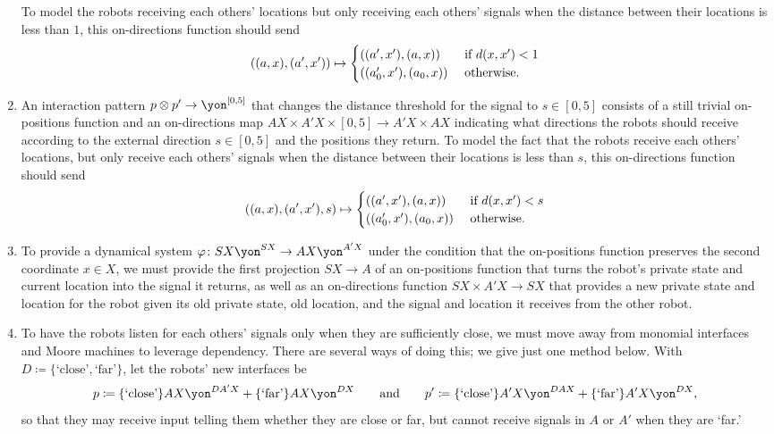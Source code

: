 \documentclass[Book-Poly]{subfiles}
\begin{document}
\begin{exercise}
\begin{solution}
\begin{enumerate}
    To model the robots receiving each others' locations but only receiving each others' signals when the distance between their locations is less than $1$, this on-directions function should send
    \[
        ((a,x),(a',x'))\mapsto
          \begin{cases}
          	((a',x'),(a,x))&\textnormal{ if }d(x,x')<1\\
          	((a'_0,x'),(a_0,x))&\textnormal{ otherwise}.
          \end{cases}
    \]
    \item An interaction pattern $p\otimes p'\to\yon^{[0,5]}$ that changes the distance threshold for the signal to $s\in[0,5]$ consists of a still trivial on-positions function and an on-directions map $AX\times A'X\times[0,5]\to A'X\times AX$ indicating what directions the robots should receive according to the external direction $s\in[0,5]$ and the positions they return.
    To model the fact that the robots receive each others' locations, but only receive each others' signals when the distance between their locations is less than $s$, this on-directions function should send
    \[
        ((a,x),(a',x'),s)\mapsto
          \begin{cases}
          	((a',x'),(a,x))&\textnormal{ if }d(x,x')<s\\
          	((a'_0,x'),(a_0,x))&\textnormal{ otherwise}.
          \end{cases}
    \]
    \item To provide a dynamical system $\varphi\colon SX\yon^{SX}\to AX\yon^{A'X}$ under the condition that the on-positions function preserves the second coordinate $x\in X$, we must provide the first projection $SX\to A$ of an on-positions function that turns the robot's private state and current location into the signal it returns, as well as an on-directions function $SX\times A'X\to SX$ that provides a new private state and location for the robot given its old private state, old location, and the signal and location it receives from the other robot.

    \item To have the robots listen for each others' signals only when they are sufficiently close, we must move away from monomial interfaces and Moore machines to leverage dependency.
    There are several ways of doing this; we give just one method below.
    With $D\coloneqq\{\text{`close'},\text{`far'}\}$, let the robots' new interfaces be
    \[
        p\coloneqq \{\text{`close'}\}AX\yon^{DA'X}+\{\text{`far'}\}AX\yon^{DX} \qqand p'\coloneqq \{\text{`close'}\}A'X\yon^{DAX}+\{\text{`far'}\}A'X\yon^{DX},
    \]
    so that they may receive input telling them whether they are close or far, but cannot receive signals in $A$ or $A'$ when they are `far.'


\end{enumerate}
\end{solution}
\end{exercise}
\end{document}
